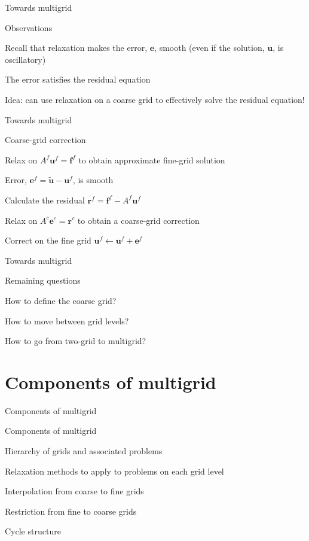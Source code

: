 \documentclass[18pt,xcolor=table]{beamer}
\begin{document}
\begin{frame}{Towards multigrid}
\begin{block}{Observations}
\bit
\item Recall that relaxation makes the error, $\mathbf{e}$, smooth (even if the solution, $\mathbf{u}$, is oscillatory)
\item The error satisfies the residual equation
\item Idea: can use relaxation on a coarse grid to effectively solve the residual equation! 
\eit
\end{block}
\end{frame}

\begin{frame}{Towards multigrid}
\begin{block}{Coarse-grid correction}
\bit
\item Relax on $A^f\mathbf{u}^f = \mathbf{f}^f$ to obtain approximate fine-grid solution
\item Error, $\mathbf{e}^f = \mathbf{\tilde u} - \mathbf{u}^f$, is smooth
\item Calculate the residual $\mathbf{r}^f = \mathbf{f}^f - A^f\mathbf{u}^f$
\item Relax on $A^c\mathbf{e}^c = \mathbf{r}^c$ to obtain a coarse-grid correction
\item Correct on the fine grid $\mathbf{u}^f \leftarrow \mathbf{u}^f + \mathbf{e}^f$
\eit
\end{block}
\end{frame}

\begin{frame}{Towards multigrid}
\begin{block}{Remaining questions}
\bit
\item How to define the coarse grid?
\item How to move between grid levels?
\item How to go from two-grid to multigrid?
\eit
\end{block}
\end{frame}


\section{Components of multigrid}

\begin{frame}{Components of multigrid}
\begin{block}{Components of multigrid}
\bit
\item Hierarchy of grids and associated problems
\item Relaxation methods to apply to problems on each grid level
\item Interpolation from coarse to fine grids
\item Restriction from fine to coarse grids
\item Cycle structure
\eit
\end{block}
\end{frame}
\end{document}
